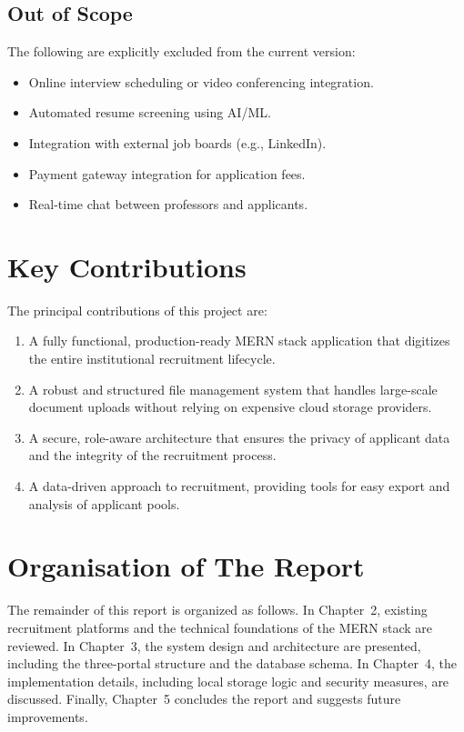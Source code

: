 \subsection{Out of Scope}

The following are explicitly excluded from the current version:

\begin{itemize}
  \item Online interview scheduling or video conferencing integration.
  \item Automated resume screening using AI/ML.
  \item Integration with external job boards (e.g., LinkedIn).
  \item Payment gateway integration for application fees.
  \item Real-time chat between professors and applicants.
\end{itemize}

\section{Key Contributions}

The principal contributions of this project are:

\begin{enumerate}
  \item A fully functional, production-ready MERN stack application that digitizes the entire institutional recruitment lifecycle.
  
  \item A robust and structured file management system that handles large-scale document uploads without relying on expensive cloud storage providers.
  
  \item A secure, role-aware architecture that ensures the privacy of applicant data and the integrity of the recruitment process.
  
  \item A data-driven approach to recruitment, providing tools for easy export and analysis of applicant pools.
\end{enumerate}

\section{Organisation of The Report}

The remainder of this report is organized as follows.
In Chapter~2, existing recruitment platforms and the technical foundations of the MERN stack are reviewed.
In Chapter~3, the system design and architecture are presented, including the three-portal structure and the database schema.
In Chapter~4, the implementation details, including local storage logic and security measures, are discussed.
Finally, Chapter~5 concludes the report and suggests future improvements.